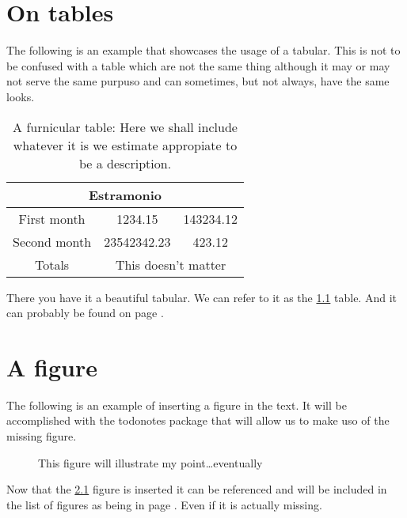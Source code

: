 \chapter{On tables}
The following is an example that showcases the usage of a tabular.
This is not to be confused with a table which are not the same thing although it may or may not serve the same purpuso and can sometimes, but not always, have the same looks.

\begin{table}[h]
	\centering
\begin{tabular}{ccc}
	\hline
	            \multicolumn{3}{c}{Estramonio}             \\ \hline
	First month  &   1234.15   &         143234.12         \\
	Second month & 23542342.23 &          423.12           \\ \hline
	   Totals    & \multicolumn{2}{c}{This doesn't matter} \\ \hline
\end{tabular}
	\caption[A first table]{A furnicular table: Here we shall include whatever it is we estimate appropiate to be a description.}
	\label{tab:first}
\end{table}

There you have it a beautiful tabular. We can refer to it as the \ref{tab:first} table. And it can probably be found on page \pageref{tab:first}.

\lipsum

\chapter{A figure}

The following is an example of inserting a figure in the text. It will be accomplished with the todonotes  package that will allow us to make uso of the missing figure.

\begin{figure}[h]
	\centering
	\caption[A missing figure]{This figure will illustrate my point…eventually}
	\label{fig:miss}
\end{figure}

Now that the \ref{fig:miss} figure is inserted it can be referenced and will be included in the list of figures as being in page \pageref{fig:miss}. Even if it is actually missing.

\lipsum
